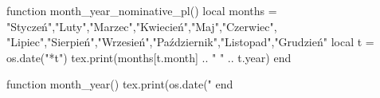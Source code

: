   \begin{luacode}
    function month_year_nominative_pl()
    local months = {
      "Styczeń","Luty","Marzec","Kwiecień","Maj","Czerwiec",
      "Lipiec","Sierpień","Wrzesień","Październik","Listopad","Grudzień"
    }
    local t = os.date("*t")
    tex.print(months[t.month] .. " " .. t.year)
    end

    function month_year()
    tex.print(os.date("%
        end
      \end{luacode}

      \newcommand{\IncludeAllTexFromFolder}[1]{%
        \directlua{include_all_tex_from_folder("#1")}%
      }


